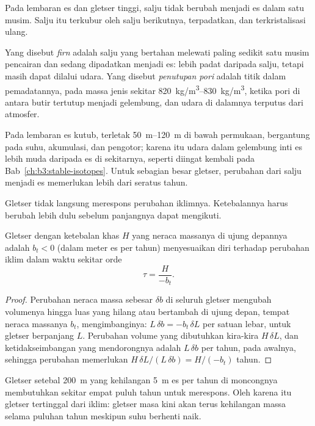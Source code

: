 Pada lembaran es dan gletser tinggi, salju tidak berubah menjadi es dalam
satu musim. Salju itu terkubur oleh salju berikutnya, terpadatkan, dan terkristalisasi ulang.

\begin{definition}\label{def:b3:glaciology:firn}
Yang disebut \emph{firn} adalah salju yang bertahan melewati paling sedikit satu musim pencairan
dan sedang dipadatkan menjadi es: lebih padat daripada salju, tetapi masih dapat dilalui udara.
Yang disebut \emph{penutupan pori} adalah titik dalam
pemadatannya, pada massa jenis sekitar \qtyrange{820}{830}{kg/m^3}, ketika
pori di antara butir tertutup menjadi gelembung, dan udara di dalamnya
terputus dari atmosfer.
\end{definition}

Pada lembaran es kutub,  terletak \qtyrange{50}{120}{m} di bawah
permukaan, bergantung pada suhu, akumulasi, dan
pengotor; karena itu udara dalam gelembung inti es lebih muda daripada
es di sekitarnya, seperti diingat kembali pada Bab~\ref{ch:b3:stable-isotopes}. Untuk sebagian besar
gletser, perubahan dari salju menjadi es memerlukan lebih dari seratus tahun.

Gletser tidak langsung merespons perubahan iklimnya. Ketebalannya
harus berubah lebih dulu sebelum panjangnya dapat mengikuti.

\begin{proposition}\label{prop:b3:glaciology:response}
Gletser dengan ketebalan khas $H$ yang neraca massanya di ujung depannya adalah $b_t <
0$ (dalam meter es per tahun) menyesuaikan diri terhadap perubahan iklim dalam waktu
sekitar orde
\[
\tau = \frac{H}{-b_t} .
\]
\end{proposition}

\begin{proof}
Perubahan neraca massa sebesar $\delta b$ di seluruh gletser mengubah volumenya
hingga luas yang hilang atau bertambah di ujung depan, tempat neraca massanya $b_t$,
mengimbanginya: $L\,\delta b = -b_t\,\delta L$ per satuan lebar, untuk gletser
berpanjang $L$. Perubahan volume yang dibutuhkan kira-kira $H\,\delta L$, dan
ketidakseimbangan yang mendorongnya adalah $L\,\delta b$ per tahun, pada awalnya, sehingga
perubahan memerlukan $H\,\delta L/(L\,\delta b) = H/(-b_t)$ tahun.
\end{proof}

Gletser setebal \qty{200}{m} yang kehilangan \qty{5}{m} es per tahun di
moncongnya membutuhkan sekitar empat puluh tahun untuk merespons. Oleh karena itu gletser tertinggal dari
iklim: gletser masa kini akan terus kehilangan massa selama puluhan tahun meskipun
suhu berhenti naik.

